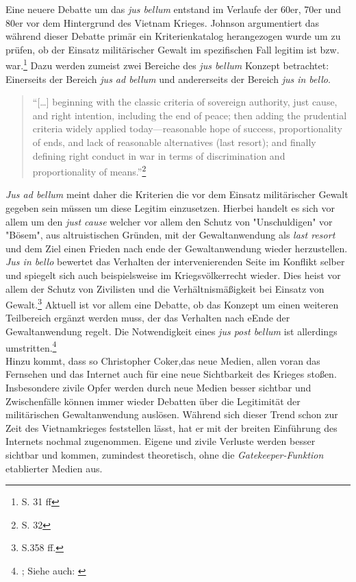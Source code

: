 \documentclass[11pt,a4paper,oneside,numbers=noenddot,bibliography=totocnumbered,DIV=13]{scrartcl}
\begin{document}
Eine neuere Debatte um das \textit{jus bellum} entstand im Verlaufe der 60er, 70er und 80er vor dem Hintergrund des Vietnam Krieges. Johnson argumentiert das während dieser Debatte primär ein Kriterienkatalog herangezogen wurde um zu prüfen, ob der Einsatz militärischer Gewalt im spezifischen Fall legitim ist bzw. war.\footnote{\cite{johnson_contemporary_2013} S. 31 ff} 
Dazu werden zumeist zwei Bereiche des \textit{jus bellum} Konzept betrachtet: Einerseits der Bereich \textit{jus ad bellum} und andererseits der Bereich \textit{jus in bello}. 
\begin{quote}
“[…] beginning with the classic criteria of sovereign authority, just cause, and right intention, including the end of peace; then adding the prudential criteria widely applied today—reasonable hope of success, proportionality of ends, and lack of reasonable alternatives (last resort); and finally defining right conduct in war in terms of discrimination and proportionality of means.”\footnote{\cite{johnson_contemporary_2013}S. 32} \\
\end{quote}
\textit{Jus ad bellum} meint daher die Kriterien die vor dem Einsatz militärischer Gewalt gegeben sein müssen um diese Legitim einzusetzen. Hierbei handelt es sich vor allem um den \textit{just cause} welcher vor allem den Schutz von "Unschuldigen" vor "Bösem", aus altruistischen Gründen, mit der Gewaltanwendung als \textit{last resort} und dem Ziel einen Frieden nach ende der Gewaltanwendung wieder herzustellen.
 \textit{Jus in bello} bewertet das Verhalten der intervenierenden Seite im Konflikt selber und spiegelt sich auch beispielsweise im Kriegsvölkerrecht wieder. Dies heist vor allem der Schutz von Zivilisten und die Verhältnismäßigkeit bei Einsatz von Gewalt.\footnote{\cite{rengger_just_2002}S.358 ff.} Aktuell ist vor allem eine Debatte, ob das Konzept um einen weiteren Teilbereich ergänzt werden muss, der das Verhalten nach eEnde der Gewaltanwendung regelt. Die Notwendigkeit eines \textit{jus post bellum} ist allerdings umstritten.\footnote{\cite{bellamy_responsibilities_2008}; Siehe auch: \cite{banta_virtuous_2011}}\\    
Hinzu kommt, dass so Christopher Coker,das neue Medien, allen voran das Fernsehen und das Internet auch für eine neue Sichtbarkeit des Krieges stoßen. Insbesondere zivile Opfer werden durch neue Medien besser sichtbar und Zwischenfälle können immer wieder Debatten über die Legitimität der militärischen Gewaltanwendung auslösen. Während sich dieser Trend schon zur Zeit des Vietnamkrieges feststellen lässt, hat er mit der breiten Einführung des Internets nochmal zugenommen. Eigene und zivile Verluste werden besser sichtbar und kommen, zumindest theoretisch, ohne die \textit{Gatekeeper-Funktion} etablierter Medien aus.\\
\end{document}
